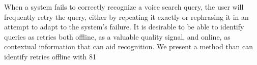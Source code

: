 When a system fails to correctly recognize a voice search query, the user will frequently retry the query, either by repeating it exactly or rephrasing it in an attempt to adapt to the system's failure. It is desirable to be able to identify queries as retries both offline, as a valuable quality signal, and online, as contextual information that can aid recognition. We present a method than can identify retries offline with 81\\%
